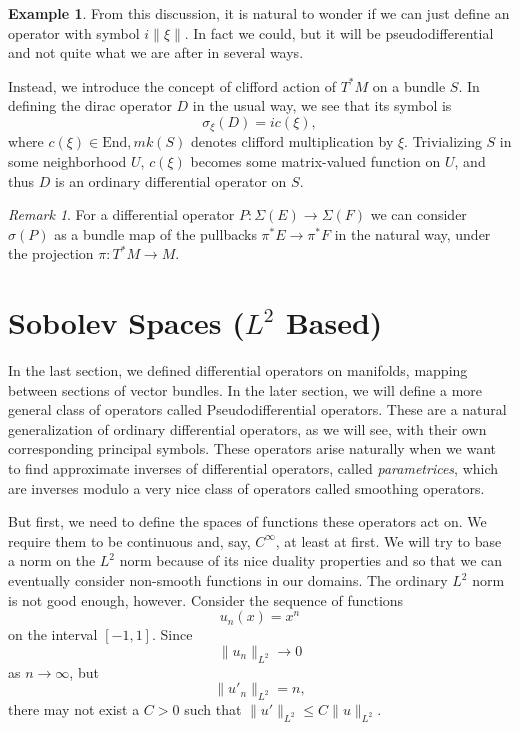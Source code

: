 \documentclass[14pt, reqno]{extarticle}
\theoremstyle{plain}
\theoremstyle{definition}
\newtheorem*{example}{Example}
\theoremstyle{remark}
\newtheorem*{remark}{Remark}
\begin{document}
\begin{example}
    From this discussion, it is natural to wonder if we can just define an operator with symbol $i\|\xi\|$. 
    In fact we could, but it will be pseudodifferential and not quite what we are after in several ways. 

    Instead, we introduce the concept of clifford action of $T^*M$ on a bundle $S$. In defining the 
    dirac operator $D$ in the usual way, we see that its symbol is 
    \[
        \sigma_\xi(D) = ic(\xi),
    \]
    where $c(\xi) \in \text{End},mk(S)$ denotes clifford multiplication by $\xi$. Trivializing $S$ in some neighborhood $U$, $c(\xi)$ becomes 
    some matrix-valued function on $U$, and thus $D$ is an ordinary differential operator on $S$. 
\end{example}

\begin{remark}
    For a differential operator $P: \Sigma(E) \to \Sigma(F)$ we can consider $\sigma(P)$ as a bundle map of the pullbacks 
    $\pi^*E \to \pi^*F$ in the natural way, under the projection $\pi: T^*M \to M$.
\end{remark}

\newpage

\section{Sobolev Spaces ($L^2$ Based)}

In the last section, we defined differential operators on manifolds, mapping
between sections of vector bundles. In the later section, we will define a 
more general class of operators called Pseudodifferential operators. 
These are a natural generalization of ordinary
differential operators, as we will see, with their own corresponding principal symbols.
These operators arise naturally when we want to find approximate inverses of 
differential operators, called \textit{parametrices}, which are inverses modulo a 
very nice class of operators called smoothing operators. 

But first, we need to define the spaces of functions these operators act on. 
We require them to be continuous and, say, $C^\infty$, at least at first. 
We will try to base a norm on the $L^2$ norm because of its nice duality properties and
so that we can eventually consider non-smooth functions in our domains. The ordinary
$L^2$ norm is not good enough, however. Consider the sequence of functions 
\[
    u_n(x) = x^n
\]
on the interval $[-1,1]$.
Since 
\[
    \|u_n\|_{L^2} \to 0
\]
as $n \to \infty$, but
\[
    \|u'_n\|_{L^2} = n,
\]
there may not exist a $C > 0$ such that $\|u'\|_{L^2} \leq C \|u\|_{L^2}$.
\end{document}
